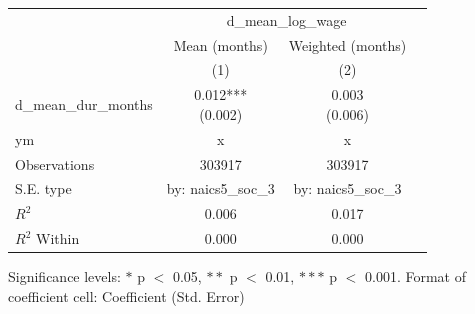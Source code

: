 \renewcommand\cellalign{t}
\begin{threeparttable}
\begin{tabular}{lccc}
\toprule
 & \multicolumn{2}{c}{d_mean_log_wage} \\
\cmidrule(lr){2-3} 
 & Mean (months) & Weighted (months) \\
 & (1) & (2) \\
\midrule
\addlinespace
d_mean_dur_months & \makecell{0.012*** \\ (0.002)} & \makecell{0.003 \\ (0.006)} \\
\midrule
\addlinespace
ym & x & x \\
\midrule
\addlinespace
Observations & 303917 & 303917 \\
S.E. type & by: naics5_soc_3 & by: naics5_soc_3 \\
$R^2$ & 0.006 & 0.017 \\
$R^2$ Within & 0.000 & 0.000 \\
\bottomrule
\end{tabular}
\footnotesize Significance levels: $*$ p $<$ 0.05, $**$ p $<$ 0.01, $***$ p $<$ 0.001. Format of coefficient cell: Coefficient 
 (Std. Error)
\end{threeparttable}